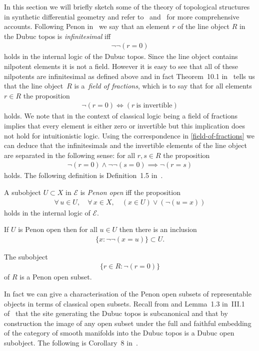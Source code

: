 \documentclass[10pt,a4paper]{amsart}
\numberwithin{equation}{section}
\begin{document}
In this section we will brief\/ly sketch some of the theory of topological structures in synthetic dif\/ferential geometry and refer to~\cite{1987BungeMartaandDubucEduardoJ131} and~\cite{MR798526} for more comprehensive accounts. Following Penon in~\cite{MR609161} we say that an element $r$ of the line object $R$ in the Dubuc topos is \emph{infinitesimal} if\/f
\begin{gather*}\neg\neg(r=0)\end{gather*}
holds in the internal logic of the Dubuc topos. Since the line object contains nilpotent elements it is not a f\/ield. However it is easy to see that all of these nilpotents are inf\/initesimal as def\/ined above and in fact Theorem~10.1 in~\cite{MR2244115} tells us that the line object~$R$ is a~\emph{field of fractions}, which is to say that for all elements $r\in R$ the proposition
\begin{gather}\label{field-of-fractions}
 \neg(r=0)\iff (r~\text{is invertible})
\end{gather}
holds. We note that in the context of classical logic being a f\/ield of fractions implies that every element is either zero or invertible but this implication does not hold for intuitionistic logic. Using the correspondence in \eqref{field-of-fractions} we can deduce that the inf\/initesimals and the invertible elements of the line object are separated in the following sense: for all $r,s\in R$ the proposition
\begin{gather*}\neg(r=0)\wedge\neg\neg(s=0)\implies \neg(r=s)\end{gather*}
holds. The following def\/inition is Def\/inition~1.5 in~\cite{MR866615}.
\begin{Definition}\label{04/16/1505:00:39 PM}
A subobject $U\subset X$ in $\mathcal{E}$ is \emph{Penon open} if\/f the proposition
\begin{gather*}\forall\, u\in U, \quad \forall\, x\in X, \quad (x\in U)\vee(\neg(u=x))\end{gather*}
holds in the internal logic of $\mathcal{E}$.
\end{Definition}
\begin{Remark}If $U$ is Penon open then for all $u\in U$ then there is an inclusion
\begin{gather*}\{x\colon \neg\neg (x=u)\}\subset U.\end{gather*}
\end{Remark}
\begin{Example}
The subobject
\begin{gather*}\{r\in R\colon \neg(r=0)\}\end{gather*}
of $R$ is a Penon open subset.
\end{Example}In fact we can give a characterisation of the Penon open subsets of representable objects in terms of classical open subsets. Recall from \cite{1981EduardoJDubuc80} and Lemma~1.3 in~III.1 of~\cite{MR1083355} that the site generating the Dubuc topos is subcanonical and that by construction the image of any open subset under the full and faithful embedding of the category of smooth manifolds into the Dubuc topos is a Dubuc open subobject. The following is Corollary~8 in~\cite{MR1055025}.
\end{document}
